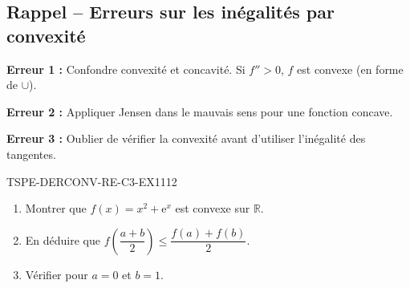 

\subsection*{Rappel -- Erreurs sur les inégalités par convexité}

\textbf{Erreur 1 :} Confondre convexité et concavité. Si $f'' > 0$, $f$ est convexe (en forme de $\cup$).

\textbf{Erreur 2 :} Appliquer Jensen dans le mauvais sens pour une fonction concave.

\textbf{Erreur 3 :} Oublier de vérifier la convexité avant d'utiliser l'inégalité des tangentes.

\begin{exercice}{TSPE-DERCONV-RE-C3-EX1}{1}{12}
\begin{enumerate}
  \item Montrer que $f(x) = x^2 + \mathrm{e}^x$ est convexe sur $\mathbb{R}$.
  \item En déduire que $f\!\left(\dfrac{a+b}{2}\right) \leq \dfrac{f(a) + f(b)}{2}$.
  \item Vérifier pour $a = 0$ et $b = 1$.
\end{enumerate}
\end{exercice}

